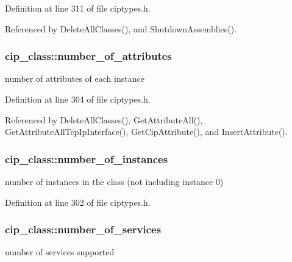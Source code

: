 \-Definition at line 311 of file ciptypes.\-h.



\-Referenced by \-Delete\-All\-Classes(), and \-Shutdown\-Assemblies().

\hypertarget{structcip__class_aa4893264d371cf20b178deda0e616c58}{
\subsubsection[{number\-\_\-of\-\_\-attributes}]{ {\bf cip\-\_\-class\-::number\-\_\-of\-\_\-attributes}}}\label{da/d8e/structcip__class_aa4893264d371cf20b178deda0e616c58}
number of attributes of each instance 

\-Definition at line 304 of file ciptypes.\-h.



\-Referenced by \-Delete\-All\-Classes(), \-Get\-Attribute\-All(), \-Get\-Attribute\-All\-Tcp\-Ip\-Interface(), \-Get\-Cip\-Attribute(), and \-Insert\-Attribute().

\hypertarget{structcip__class_a1f3c4ea3fd60256ae9dc48b14acf1ae3}{
\subsubsection[{number\-\_\-of\-\_\-instances}]{ {\bf cip\-\_\-class\-::number\-\_\-of\-\_\-instances}}}\label{da/d8e/structcip__class_a1f3c4ea3fd60256ae9dc48b14acf1ae3}
number of instances in the class (not including instance 0) 

\-Definition at line 302 of file ciptypes.\-h.

\hypertarget{structcip__class_a4d33f12577046f545d90a1b8b764a885}{
\subsubsection[{number\-\_\-of\-\_\-services}]{ {\bf cip\-\_\-class\-::number\-\_\-of\-\_\-services}}}\label{da/d8e/structcip__class_a4d33f12577046f545d90a1b8b764a885}
number of services supported 

